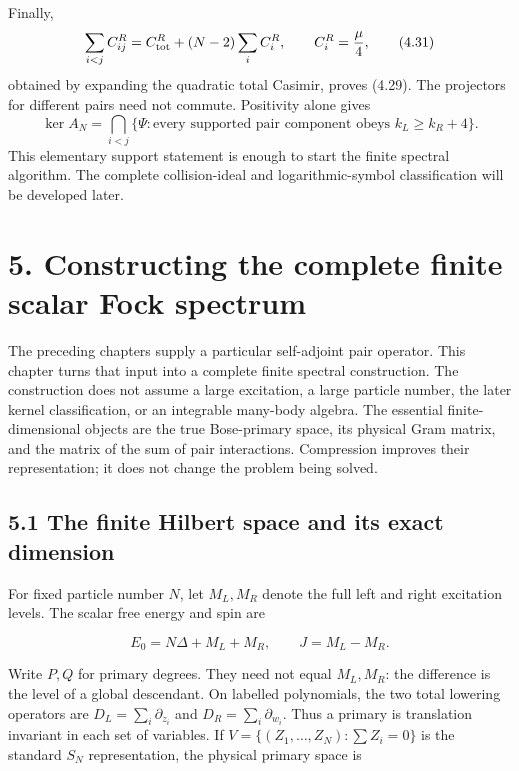 \documentclass[a4paper,11pt]{article}
\numberwithin{equation}{section}
\begin{document}
Finally, \[
\sum_{i<j}C_{ij}^R
=C_{\rm tot}^R+(N-2)\sum_iC_i^R,\qquad
C_i^R=\frac{\mu}{4},
\tag{4.31}
\] obtained by expanding the quadratic total Casimir, proves (4.29). The projectors for different pairs need not commute. Positivity alone gives \[
\ker A_N
=\bigcap_{i<j}
\{\Psi:\text{every supported pair component obeys }k_L\ge k_R+4\}.
\tag{4.32}
\] This elementary support statement is enough to start the finite spectral algorithm. The complete collision-ideal and logarithmic-symbol classification will be developed later.

\clearpage
\hypertarget{constructing-the-complete-finite-scalar-fock-spectrum}{%
\section{5. Constructing the complete finite scalar Fock spectrum}\label{constructing-the-complete-finite-scalar-fock-spectrum}}

The preceding chapters supply a particular self-adjoint pair operator. This chapter turns that input into a complete finite spectral construction. The construction does not assume a large excitation, a large particle number, the later kernel classification, or an integrable many-body algebra. The essential finite-dimensional objects are the true Bose-primary space, its physical Gram matrix, and the matrix of the sum of pair interactions. Compression improves their representation; it does not change the problem being solved.

\hypertarget{the-finite-hilbert-space-and-its-exact-dimension}{%
\subsection{5.1 The finite Hilbert space and its exact dimension}\label{the-finite-hilbert-space-and-its-exact-dimension}}

For fixed particle number \(N\), let \(M_L,M_R\) denote the full left and right excitation levels. The scalar free energy and spin are

\[
E_0=N\Delta+M_L+M_R,\qquad J=M_L-M_R.
\tag{5.1}
\]

Write \(P,Q\) for primary degrees. They need not equal \(M_L,M_R\): the difference is the level of a global descendant. On labelled polynomials, the two total lowering operators are \(D_L=\sum_i\partial_{z_i}\) and \(D_R=\sum_i\partial_{w_i}\). Thus a primary is translation invariant in each set of variables. If \(V=\{(Z_1,\ldots,Z_N):\sum Z_i=0\}\) is the standard \(S_N\) representation, the physical primary space is
\end{document}
